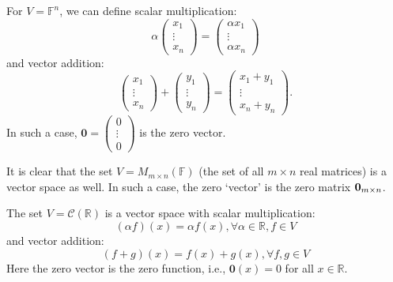 \begin{example} For \(V = {\mathbb{F}}^n\), we can define scalar multiplication:
\[
\alpha \left( \begin{matrix} {x}_1 \\  \vdots \\  {x}_n \end{matrix}\right)  = \left( \begin{matrix} \alpha {x}_1 \\  \vdots \\  \alpha {x}_n \end{matrix}\right)
\]
and vector addition:
\[
\left( \begin{matrix} {x}_1 \\  \vdots \\  {x}_n \end{matrix}\right)  + \left( \begin{matrix} {y}_1 \\  \vdots \\  {y}_n \end{matrix}\right)  = \left( \begin{matrix} {x}_1 + {y}_1 \\  \vdots \\  {x}_n + {y}_n \end{matrix}\right).
\]
In such a case,
\(
\mathbf{0} = \left( \begin{matrix} 0 \\  \vdots \\  0 \end{matrix}\right)
\) is the zero vector.
\end{example}

\begin{example}
It is clear that the set \(V = {M}_{m \times  n}\left( \mathbb{F}\right)\) (the set of all \(m \times  n\) real matrices) is a vector space as well. In such a case, the zero `vector' is the zero matrix ${\bf 0}_{m \times n}$.
\end{example}

\begin{example}
The set \(V = \mathcal{C}\left( \mathbb{R}\right)\) is a vector space with scalar multiplication:
\[
\left( {\alpha f}\right) \left( x\right)  = {\alpha f}\left( x\right) ,\forall \alpha  \in  \mathbb{R},f \in  V
\]    
and vector addition:
\[
\left( {f + g}\right) \left( x\right)  = f\left( x\right)  + g\left( x\right) ,\forall f,g \in  V
\]
Here the zero vector is the zero function, i.e., \(\mathbf{0}\left( x\right)  = 0\) for all \(x \in  \mathbb{R}\).
\end{example}


